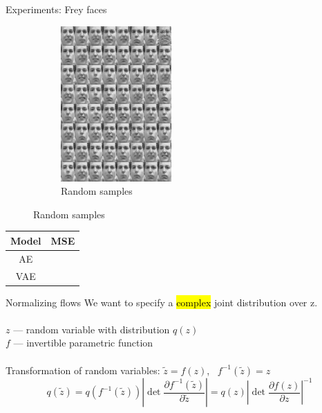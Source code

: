 \documentclass[unicode,11pt]{beamer}
\begin{document}
\begin{frame}{Experiments: Frey faces}
\begin{figure}
\begin{subfigure}[b]{.4\linewidth}
      \includegraphics[width=.8\linewidth]{images/vae_frey_B100_E4000_N560_L2_H200_C_sample_64}
      \caption{Random samples}
    \end{subfigure}
  \end{figure}

  \centering
  \begin{tabular}{cc}
    \textbf{Model} & \textbf{MSE} \\
    \hline
    AE  & \\
    VAE &
  \end{tabular}
\end{frame}


\begin{frame}
  \centering\fontsize{24pt}{1em}\color{darkred}{\selectfont{What is wrong with VAE?}}
\end{frame}


\begin{frame}[fragile]{Normalizing flows}
  We want to specify a \hl{complex} joint distribution over z.\\
  ~\\
  $z$ --- random variable with distribution $q(z)$\\  
  $f$ --- invertible parametric function\\
  ~\\
  Transformation of random variables: $\tilde{z} = f(z)$, ~$f^{-1}(\tilde{z}) = z$\\
  $$
  q(\tilde{z})
  = q(f^{-1}(\tilde{z})) \left\vert \det \frac{\partial f^{-1}(\tilde{z})}{\partial \tilde{z}} \right\vert
  = q(z) \left\vert \det \frac{\partial f(z)}{\partial z} \right\vert^{-1}
  $$ \\

\end{frame}
\end{document}
